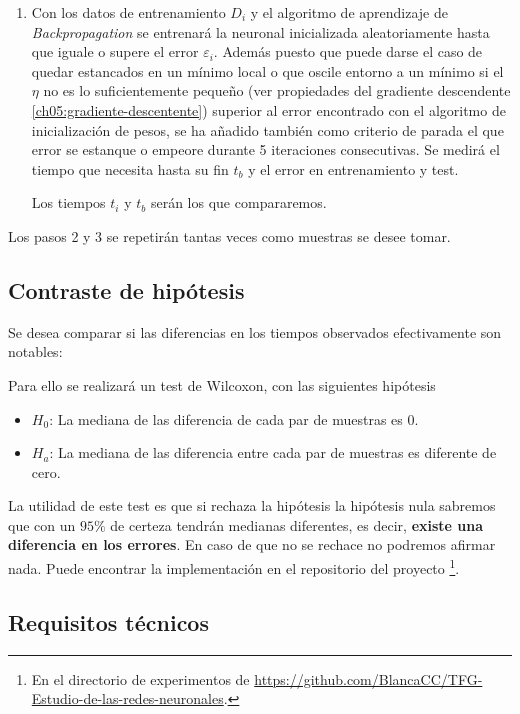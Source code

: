 \begin{enumerate}
\item Con los datos de entrenamiento $D_i$ y el algoritmo de aprendizaje de \textit{Backpropagation} se entrenará la neuronal inicializada aleatoriamente hasta que iguale o supere el error $\varepsilon_i$. Además puesto que puede darse el caso de quedar estancados en un mínimo local  o que oscile entorno a un mínimo si el $\eta$ no es lo suficientemente pequeño (ver propiedades del gradiente descendente \ref{ch05:gradiente-descentente})
superior al error encontrado con el algoritmo de inicialización de pesos, se ha añadido también como criterio de parada el que error se estanque o empeore durante 5 iteraciones consecutivas. 
Se medirá el tiempo que necesita hasta su fin $t_b$ y el error en entrenamiento y test. 

Los tiempos $t_i$ y $t_b$ serán los que compararemos. 
\end{enumerate}

Los pasos 2 y 3 se repetirán tantas veces como 
muestras se desee tomar. 

\subsection{Contraste de hipótesis}

Se desea comparar si las diferencias en los tiempos observados efectivamente son notables: 

Para ello se realizará un test de Wilcoxon, con las siguientes hipótesis

\begin{itemize}
    \item $H_0$: La mediana de las diferencia de cada par de muestras es $0$. 
    \item $H_a$: La mediana de las diferencia entre cada par de muestras es diferente de cero. 
\end{itemize}

La utilidad de este test es que si rechaza la hipótesis la hipótesis nula sabremos que con un $95 \%$ de certeza tendrán medianas diferentes, es decir, \textbf{existe una 
diferencia en los errores}. En caso de que no se rechace no podremos afirmar nada.
Puede encontrar la implementación en el repositorio del
 proyecto \footnote{En el directorio de experimentos 
 de \url{https://github.com/BlancaCC/TFG-Estudio-de-las-redes-neuronales}.}.

\subsection{Requisitos técnicos}  

